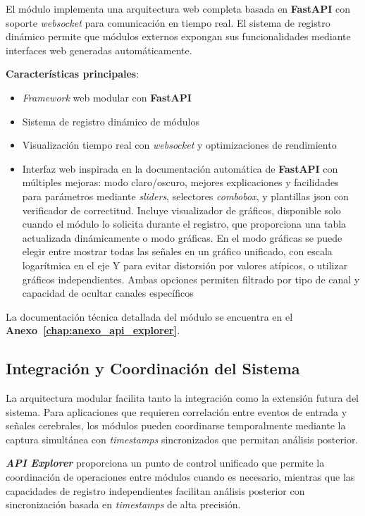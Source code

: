 El módulo implementa una arquitectura web completa basada en \textbf{FastAPI} con soporte \textit{\gls{websocket}} para comunicación en tiempo real. El sistema de registro dinámico permite que módulos externos expongan sus funcionalidades mediante interfaces web generadas automáticamente.

\textbf{Características principales}:
\begin{itemize}
    \item \textit{Framework} web modular con \textbf{FastAPI}
    \item Sistema de registro dinámico de módulos
    \item Visualización tiempo real con \textit{\gls{websocket}} y optimizaciones de rendimiento
    \item Interfaz web inspirada en la documentación automática de \textbf{FastAPI} con múltiples mejoras: modo claro/oscuro, mejores explicaciones y facilidades para parámetros mediante \textit{sliders}, selectores \textit{combobox}, y plantillas \acrshort{json} con verificador de correctitud. Incluye visualizador de gráficos, disponible solo cuando el módulo lo solicita durante el registro, que proporciona una tabla actualizada dinámicamente o modo gráficas. En el modo gráficas se puede elegir entre mostrar todas las señales en un gráfico unificado, con escala logarítmica en el eje Y para evitar distorsión por valores atípicos, o utilizar gráficos independientes. Ambas opciones permiten filtrado por tipo de canal y capacidad de ocultar canales específicos
\end{itemize}

La documentación técnica detallada del módulo se encuentra en el \textbf{Anexo~\ref{chap:anexo_api_explorer}}.

\subsection{Integración y Coordinación del Sistema}
\label{subsec:integracion_coordinacion_sistema}

La arquitectura modular facilita tanto la integración como la extensión futura del sistema. Para aplicaciones que requieren correlación entre eventos de entrada y señales cerebrales, los módulos pueden coordinarse temporalmente mediante la captura simultánea con \textit{\glspl{timestamp}} sincronizados que permitan análisis posterior.

\textit{\textbf{API Explorer}} proporciona un punto de control unificado que permite la coordinación de operaciones entre módulos cuando es necesario, mientras que las capacidades de registro independientes facilitan análisis posterior con sincronización basada en \textit{\glspl{timestamp}} de alta precisión.

